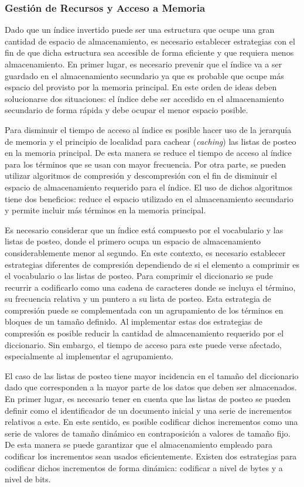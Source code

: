 \subsubsection{Gestión de Recursos y Acceso a Memoria}
Dado que un índice invertido puede ser una estructura que ocupe una gran cantidad de espacio de almacenamiento, es necesario establecer estrategias con el fin de que dicha estructura sea accesible de forma eficiente y que requiera menos almacenamiento. En primer lugar, es necesario prevenir que el índice va a ser guardado en el almacenamiento secundario ya que es probable que ocupe más espacio del provisto por la memoria principal. En este orden de ideas deben solucionarse dos situaciones: el índice debe ser accedido en el almacenamiento secundario de forma rápida y debe ocupar el menor espacio posible.

Para disminuir el tiempo de acceso al índice es posible hacer uso de la jerarquía de memoria y el principio de localidad para cachear (\textit{caching}) las listas de posteo en la memoria principal. De esta manera se reduce el tiempo de acceso al índice para los términos que se usan con mayor frecuencia. Por otra parte, se pueden utilizar algoritmos de compresión y descompresión con el fin de disminuir el espacio de almacenamiento requerido para el índice. El uso de dichos algoritmos tiene dos beneficios: reduce el espacio utilizado en el almacenamiento secundario y permite incluir más términos en la memoria principal.

Es necesario considerar que un índice está compuesto por el vocabulario y las listas de posteo, donde el primero ocupa un espacio de almacenamiento considerablemente menor al segundo. En este contexto, es necesario establecer estrategias diferentes de compresión dependiendo de si el elemento a comprimir es el vocabulario o las listas de posteo. Para comprimir el diccionario se pude recurrir a codificarlo como una cadena de caracteres donde se incluya el término, su frecuencia relativa y un puntero a su lista de posteo. Esta estrategia de compresión puede se complementada con un agrupamiento de los términos en bloques de un tamaño definido. Al implementar estas dos estrategias de compresión es posible reducir la cantidad de almacenamiento requerido por el diccionario. Sin embargo, el tiempo de acceso para este puede verse afectado, especialmente al implementar el agrupamiento. 

El caso de las listas de posteo tiene mayor incidencia en el tamaño del diccionario dado que corresponden a la mayor parte de los datos que deben ser almacenados. En primer lugar, es necesario tener en cuenta que las listas de posteo se pueden definir como el identificador de un documento inicial y una serie de incrementos relativos a este. En este sentido, es posible codificar dichos incrementos como una serie de valores de tamaño dinámico en contraposición a valores de tamaño fijo. De esta manera se puede garantizar que el almacenamiento empleado para codificar los incrementos sean usados eficientemente. Existen dos estrategias para codificar dichos incrementos de forma dinámica: codificar a nivel de bytes y a nivel de bits. 

